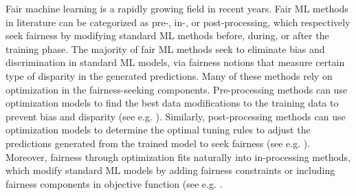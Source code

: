 \documentclass{article}[11pt]
\begin{document}
Fair machine learning is a rapidly growing field in recent years. Fair ML methods in literature can be categorized as pre-, in-, or post-processing, which respectively seek fairness by modifying standard ML methods before, during, or after the training phase. The majority of fair ML methods seek to eliminate bias and discrimination in standard ML models, via fairness notions that measure certain type of disparity in the generated predictions. Many of these methods rely on optimization in the fairness-seeking components. Pre-processing methods can use optimization models to find the best data modifications to the training data to prevent bias and disparity (see e.g. \cite{zemel2013learning, calmon2017optimized}). Similarly, post-processing methods can use optimization models to determine the optimal tuning rules to adjust the predictions generated from the trained model to seek fairness (see e.g. \cite{hardt2016equality, alabdulmohsin2020fair}). Moreover, fairness through optimization fits naturally into in-processing methods, which modify standard ML models by adding fairness constraints or including fairness components in objective function (see e.g. \cite{zafar2019fairness,olfat2018spectral,donini2018empirical}.
\end{document}
